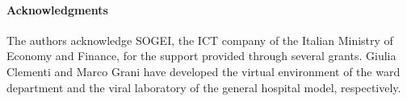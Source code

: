 \paragraph*{Acknowledgments}

The authors acknowledge SOGEI, the ICT company of the Italian Ministry of Economy and Finance, for the support provided through several grants. Giulia Clementi and Marco Grani have developed the virtual environment of the ward department and the viral laboratory of the general hospital model, respectively.
